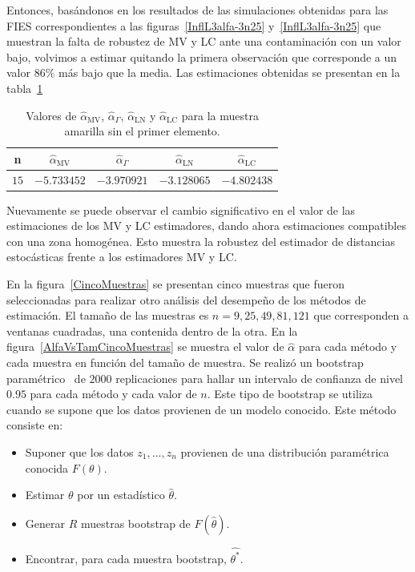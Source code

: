 Entonces, basándonos en los resultados de las simulaciones obtenidas para las FIES correspondientes a las figuras~\ref{InflL3alfa-3n25} y~\ref{InflL3alfa-3n25} que muestran la falta de robustez de MV y LC ante una contaminación con un valor bajo, volvimos a estimar quitando la primera observación que corresponde a un valor $86\%$ más bajo que la media. Las estimaciones obtenidas se presentan en la tabla~\ref{SinPrimero}
\begin{table}[htb]
	\centering
	\caption{\label{SinPrimero} Valores de $\widehat{\alpha}_{\text{MV}}$, $\widehat{\alpha}_{\Gamma}$, $\widehat{\alpha}_{\text{LN}}$ y $\widehat{\alpha}_{\text{LC}}$ para la muestra amarilla sin el primer elemento.}
	\begin{tabular}{c*4{c}}
		\toprule
		                n    &  $\widehat{\alpha}_{\text{MV}}$    &  $\widehat{\alpha}_{\Gamma}$  &  $\widehat{\alpha}_{\text{LN}}$ &  $\widehat{\alpha}_{\text{LC}}$\\
		\midrule
		               $15$  & $-5.733452$   & $-3.970921$    & $-3.128065$    & $-4.802438$\\
		\bottomrule
	\end{tabular}
\end{table}
 
Nuevamente se puede observar el cambio significativo en el valor de las estimaciones de los MV y LC estimadores, dando ahora estimaciones compatibles con una zona homogénea. Esto muestra la robustez del estimador de distancias estocásticas frente a los estimadores MV y LC.

En la figura~\ref{CincoMuestras} se presentan cinco muestras que fueron seleccionadas para realizar otro análisis del desempeño de los métodos de estimación. El tamaño de las muestras es $n=9,25,49,81,121$ que corresponden a ventanas cuadradas, una contenida dentro de la otra. En la figura~\ref{AlfaVsTamCincoMuestras} se muestra el valor de $\widehat{\alpha}$ para cada método y cada muestra en función del tamaño de muestra. Se realizó un bootstrap paramétrico~\cite{Davison1997} de $2000$ replicaciones para hallar un intervalo de confianza de nivel $0.95$ para cada método y cada valor de $n$. Este tipo de bootstrap se utiliza cuando se supone que los datos provienen de un modelo conocido. Este método consiste en:
\begin{itemize}
	\item Suponer que los datos $z_1,\ldots,z_n$ provienen de una distribución paramétrica conocida $F(\theta)$.
	\item Estimar $\theta$ por un estadístico $\widehat{\theta}$.
	\item Generar $R$ muestras bootstrap de $F(\widehat{\theta})$.
	\item Encontrar, para cada muestra bootstrap, $\widehat{\theta^*}$.
\end{itemize}

